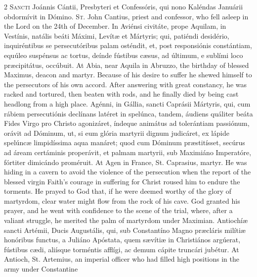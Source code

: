\begin{paracol}{2}
\lettrine[lines=2]{S}{ancti} Joánnis Cántii, 
 Presbyteri et Confessóris, qui nono Kaléndas Januárii obdormívit in Dómino.
\switchcolumn
{}
\lettrine[lines=2]{S}{t.} John Cantius, priest and 
 confessor, who fell asleep in the Lord on the 24th of December.
\switchcolumn*
{}
In Aviénsi civitáte, 
 prope Aquilam, in Vestínis, natális beáti Máximi, Levítæ et Mártyris; qui, 
 patiéndi desidério, inquiréntibus se persecutóribus palam osténdit, et, post 
 responsiónis constántiam, equúleo suspénsus ac tortus, deínde fústibus cæsus, 
 ad últimum, e sublími loco præcipitátus, occúbuit.
\switchcolumn
{}
At Abia, near Aquila in Abruzzo, the 
 birthday of blessed Maximus, deacon and martyr. Because of his desire 
 to suffer he shewed himself to the persecutors of his own accord. 
 After answering with great constancy, he was racked and tortured, then 
 beaten with rods, and he finally died by being cast headlong from a high 
 place.
\switchcolumn*
{}
Agénni, in Gállia, 
 sancti Caprásii Mártyris, qui, cum rábiem persecutiónis declínans latéret in 
 spelúnca, tandem, áudiens quáliter beáta Fides Virgo pro Christo agonizáret, 
 índeque animátus ad tolerántiam passiónum, orávit ad Dóminum, ut, si eum 
 glória martyrii dignum judicáret, ex lápide spelúncæ limpidíssima aqua 
 manáret; quod cum Dóminum præstitísset, secúrus ad áream certáminis 
 properávit, et palmam martyrii, sub Maximiáno Imperatóre, fórtiter dimicándo 
 proméruit.
\switchcolumn
{}
At Agen in France, St. Caprasius, 
 martyr. He was hiding in a cavern to avoid the violence of the 
 persecution when the report of the blessed virgin Faith's courage in 
 suffering for Christ roused him to endure the torments. He prayed to 
 God that, if he were deemed worthy of the glory of martyrdom, clear water 
 might flow from the rock of his cave. God granted his prayer, and he 
 went with confidence to the scene of the trial, where, after a valiant 
 struggle, he merited the palm of martyrdom under Maximian.
\switchcolumn*
{}
Antiochíæ sancti 
 Artémii, Ducis Augustális, qui, sub Constantíno Magno præcláris milítiæ 
 honóribus functus, a Juliáno Apóstata, quem sævítiæ in Christiános argúerat, 
 fústibus cædi, aliísque torméntis afflígi, ac demum cápite truncári jubétur.
\switchcolumn
{}
At Antioch, St. Artemius, an 
 imperial officer who had filled high positions in the army under Constantine 

\end{paracol}
